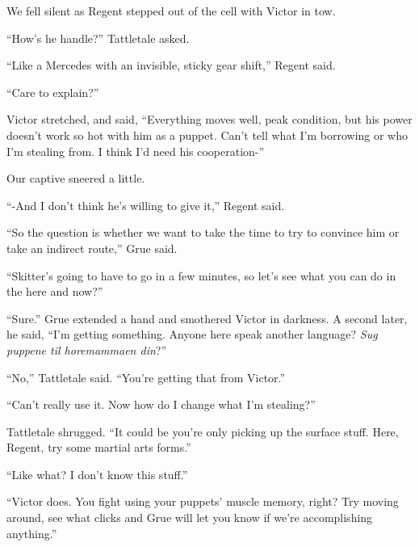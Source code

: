 





We fell silent as Regent stepped out of the cell with Victor in tow.



``How's he handle?'' Tattletale asked.



``Like a Mercedes with an invisible, sticky gear shift,'' Regent said.



``Care to explain?''



Victor stretched, and said, ``Everything moves well, peak condition, but his power doesn't work so hot with him as a puppet.  Can't tell what I'm borrowing or who I'm stealing from.  I think I'd need his cooperation-''



Our captive sneered a little.



``-And I don't think he's willing to give it,'' Regent said.



``So the question is whether we want to take the time to try to convince him or take an indirect route,'' Grue said.



``Skitter's going to have to go in a few minutes, so let's see what you can do in the here and now?''



``Sure.''  Grue extended a hand and smothered Victor in darkness.  A second later, he said, ``I'm getting something.  Anyone here speak another language? \emph{Sug puppene til horemammaen din}?''



``No,'' Tattletale said.  ``You're getting that from Victor.''



``Can't really use it.  Now how do I change what I'm stealing?''



Tattletale shrugged.  ``It could be you're only picking up the surface stuff.  Here, Regent, try some martial arts forms.''



``Like what?  I don't know this stuff.''



``Victor does.  You fight using your puppets' muscle memory, right?  Try moving around, see what clicks and Grue will let you know if we're accomplishing anything.''



